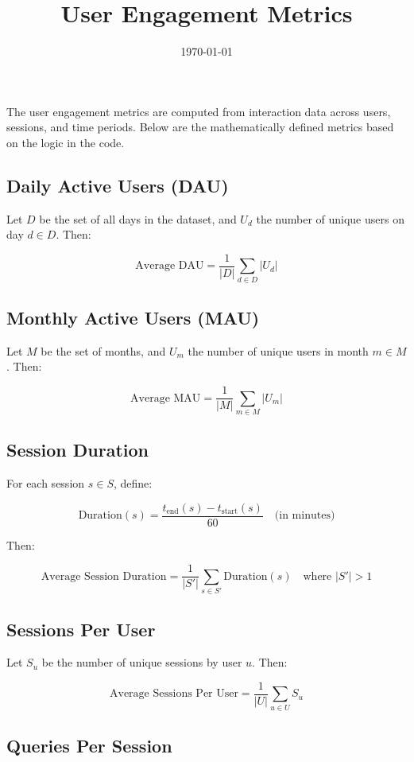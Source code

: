 \documentclass[12pt]{article}
\title{User Engagement Metrics}
\author{}
\date{\today}
\begin{document}
\maketitle

The user engagement metrics are computed from interaction data across users, sessions, and time periods. Below are the mathematically defined metrics based on the logic in the code.

\subsection*{Daily Active Users (DAU)}

Let \( D \) be the set of all days in the dataset, and \( U_d \) the number of unique users on day \( d \in D \). Then:

\[
\text{Average DAU} = \frac{1}{|D|} \sum_{d \in D} |U_d|
\]

\subsection*{Monthly Active Users (MAU)}

Let \( M \) be the set of months, and \( U_m \) the number of unique users in month \( m \in M \). Then:

\[
\text{Average MAU} = \frac{1}{|M|} \sum_{m \in M} |U_m|
\]

\subsection*{Session Duration}

For each session \( s \in S \), define:

\[
\text{Duration}(s) = \frac{t_{\text{end}}(s) - t_{\text{start}}(s)}{60} \quad \text{(in minutes)}
\]

Then:

\[
\text{Average Session Duration} = \frac{1}{|S'|} \sum_{s \in S'} \text{Duration}(s) \quad \text{where } |S'| > 1
\]

\subsection*{Sessions Per User}

Let \( S_u \) be the number of unique sessions by user \( u \). Then:

\[
\text{Average Sessions Per User} = \frac{1}{|U|} \sum_{u \in U} S_u
\]

\subsection*{Queries Per Session}
\end{document}
